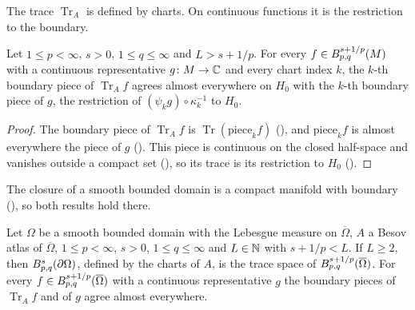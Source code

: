 The trace $\operatorname{Tr}_A$ is defined by charts. On continuous functions it is the
restriction to the boundary.

\begin{corollary}
\label{cor:manifold-trace-continuous}
\leanok
{}
Let $1 \leq p < \infty$, $s > 0$, $1 \leq q \leq \infty$ and $L > s + 1/p$. For every
$f \in B^{s+1/p}_{p,q}(M)$ with a continuous representative $g \colon M \to \mathbb{C}$ and every
chart index $k$, the $k$-th boundary piece of $\operatorname{Tr}_A f$ agrees almost everywhere on
$H_0$ with the $k$-th boundary piece of $g$, the restriction of $(\psi_k g) \circ \kappa_k^{-1}$
to $H_0$.
\end{corollary}

\begin{proof}
\leanok
The boundary piece of $\operatorname{Tr}_A f$ is $\operatorname{Tr}(\text{piece}_k f)$
(), and $\text{piece}_k f$ is almost everywhere the piece of $g$
(). This piece is continuous on the closed half-space and vanishes outside
a compact set (), so its trace is its restriction to $H_0$
().
\end{proof}

The closure of a smooth bounded domain is a compact manifold with boundary
(), so both results hold there.

\begin{corollary}
\label{cor:smooth-domain-trace}
\leanok
{}
Let $\Omega$ be a smooth bounded domain with the Lebesgue measure on $\overline{\Omega}$, $A$ a
Besov atlas of $\overline{\Omega}$, $1 \leq p < \infty$, $s > 0$, $1 \leq q \leq \infty$ and
$L \in \mathbb{N}$ with $s + 1/p < L$. If $L \geq 2$, then $B^{s}_{p,q}(\partial \Omega)$, defined by
the charts of $A$, is the trace space of $B^{s+1/p}_{p,q}(\overline{\Omega})$. For every
$f \in B^{s+1/p}_{p,q}(\overline{\Omega})$ with a continuous representative $g$ the boundary
pieces of $\operatorname{Tr}_A f$ and of $g$ agree almost everywhere.
\end{corollary}


